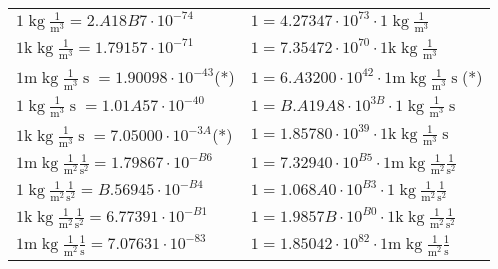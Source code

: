 \begin{center}
\begin{longtable}{l l}
{\color{black}$1 \bm{\mathrm{ }}\operatorname{kg}\frac1{\operatorname{m}^3}{}{}{} = 2.A18B7\cdot10^{-74} $}   & {\color{black}$ 1 = 4.27347\cdot10^{73} \cdot 1 \bm{\mathrm{ }}\operatorname{kg}\frac1{\operatorname{m}^3}{}{}{}$}  \\
{\color{gray}$1 \bm{\mathrm{ k}}\operatorname{kg}\frac1{\operatorname{m}^3}{}{}{} = 1.79157\cdot10^{-71} $}   & {\color{gray}$ 1 = 7.35472\cdot10^{70} \cdot 1 \bm{\mathrm{ k}}\operatorname{kg}\frac1{\operatorname{m}^3}{}{}{}$}  \\
{\color{gray}$1 \bm{\mathrm{ m}}\operatorname{kg}\frac1{\operatorname{m}^3}{\operatorname{s}}{}{} = 1.90098\cdot10^{-43} $}\quad(*) & {\color{gray}$ 1 = 6.A3200\cdot10^{42} \cdot 1 \bm{\mathrm{ m}}\operatorname{kg}\frac1{\operatorname{m}^3}{\operatorname{s}}{}{}$}\quad(*)\\
{\color{black}$1 \bm{\mathrm{ }}\operatorname{kg}\frac1{\operatorname{m}^3}{\operatorname{s}}{}{} = 1.01A57\cdot10^{-40} $}   & {\color{black}$ 1 = B.A19A8\cdot10^{3B} \cdot 1 \bm{\mathrm{ }}\operatorname{kg}\frac1{\operatorname{m}^3}{\operatorname{s}}{}{}$}  \\
{\color{gray}$1 \bm{\mathrm{ k}}\operatorname{kg}\frac1{\operatorname{m}^3}{\operatorname{s}}{}{} = 7.05000\cdot10^{-3A} $}\quad(*) & {\color{gray}$ 1 = 1.85780\cdot10^{39} \cdot 1 \bm{\mathrm{ k}}\operatorname{kg}\frac1{\operatorname{m}^3}{\operatorname{s}}{}{}$}  \\
{\color{gray}$1 \bm{\mathrm{ m}}\operatorname{kg}\frac1{\operatorname{m}^2}\frac1{\operatorname{s}^2}{}{} = 1.79867\cdot10^{-B6} $}   & {\color{gray}$ 1 = 7.32940\cdot10^{B5} \cdot 1 \bm{\mathrm{ m}}\operatorname{kg}\frac1{\operatorname{m}^2}\frac1{\operatorname{s}^2}{}{}$}  \\
{\color{black}$1 \bm{\mathrm{ }}\operatorname{kg}\frac1{\operatorname{m}^2}\frac1{\operatorname{s}^2}{}{} = B.56945\cdot10^{-B4} $}   & {\color{black}$ 1 = 1.068A0\cdot10^{B3} \cdot 1 \bm{\mathrm{ }}\operatorname{kg}\frac1{\operatorname{m}^2}\frac1{\operatorname{s}^2}{}{}$}  \\
{\color{gray}$1 \bm{\mathrm{ k}}\operatorname{kg}\frac1{\operatorname{m}^2}\frac1{\operatorname{s}^2}{}{} = 6.77391\cdot10^{-B1} $}   & {\color{gray}$ 1 = 1.9857B\cdot10^{B0} \cdot 1 \bm{\mathrm{ k}}\operatorname{kg}\frac1{\operatorname{m}^2}\frac1{\operatorname{s}^2}{}{}$}  \\
{\color{gray}$1 \bm{\mathrm{ m}}\operatorname{kg}\frac1{\operatorname{m}^2}\frac1{\operatorname{s}}{}{} = 7.07631\cdot10^{-83} $}   & {\color{gray}$ 1 = 1.85042\cdot10^{82} \cdot 1 \bm{\mathrm{ m}}\operatorname{kg}\frac1{\operatorname{m}^2}\frac1{\operatorname{s}}{}{}$}  \\

\end{longtable}
\end{center}

